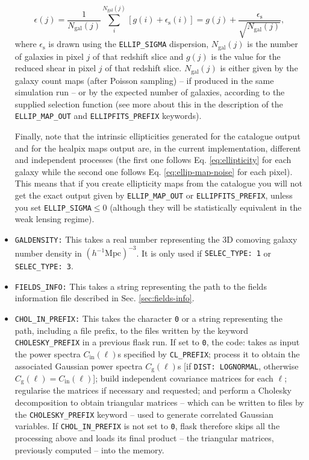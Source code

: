 \documentclass[12pt]{book} %
\newcommand{\nv}[1]{\mathrm{#1}}                 %
\begin{document}
\begin{itemize}
  \begin{equation}
    \epsilon(j) = \frac{1}{N_{\nv{gal}}(j)}\sum_i^{N_{\nv{gal}}(j)} \left[ g(i)+\epsilon_{\nv{s}}(i) \right] 
    = g(j) + \frac{\epsilon_{\nv{s}}}{\sqrt{N_{\nv{gal}}(j)}},
    \label{eq:ellip-map-noise}
  \end{equation}
  where $\epsilon_{\nv{s}}$ is drawn using the {\tt ELLIP\_SIGMA} dispersion, $N_{\nv{gal}}(j)$ is 
  the number of galaxies in pixel $j$ of that redshift slice and $g(j)$ is the value for the 
  reduced shear in pixel $j$ of that redshift slice. $N_{\nv{gal}}(j)$ is either given by the galaxy 
  count maps (after Poisson sampling) -- if produced in the same simulation run -- or by the expected 
  number of galaxies, according to the supplied selection function (see more about this in the 
  description of the {\tt ELLIP\_MAP\_OUT} and {\tt ELLIPFITS\_PREFIX} keywords). 
  
  Finally, note that the intrinsic ellipticities generated for the catalogue output and for the 
  {\sc healpix} maps output are, in the current implementation, different and independent processes 
  (the first one follows Eq. \ref{eq:ellipticity} for each galaxy while the second one follows Eq. 
  \ref{eq:ellip-map-noise} for each pixel). 
  This means that if you create ellipticity maps from the catalogue you will not get the exact output 
  given by {\tt ELLIP\_MAP\_OUT} or {\tt ELLIPFITS\_PREFIX}, unless you set {\tt ELLIP\_SIGMA}$\leq 0$ 
  (although they will be statistically equivalent in the weak lensing regime).
  
\item {\tt GALDENSITY:} This takes a real number representing the 3D comoving galaxy number 
  density in $(h^{-1}\nv{Mpc})^{-3}$. It is only used if {\tt SELEC\_TYPE: 1} or {\tt SELEC\_TYPE: 3}. 

\item {\tt FIELDS\_INFO:} This takes a string representing the path to the fields information file 
  described in Sec. \ref{sec:fields-info}.

\item {\tt CHOL\_IN\_PREFIX:} This takes the character {\tt 0} or a string representing the path, including 
  a file prefix, to the files written by the keyword {\tt CHOLESKY\_PREFIX} in a previous {\sc flask} run. If set to 
  {\tt 0}, the code: takes as input the power spectra $C_{\nv{in}}(\ell)$s specified by {\tt CL\_PREFIX}; 
  process it to obtain the associated Gaussian power spectra $C_{\nv{g}}(\ell)$s [if {\tt DIST: LOGNORMAL}, 
  otherwise $C_{\nv{g}}(\ell)=C_{\nv{in}}(\ell)$]; build independent covariance matrices for each $\ell$; 
  regularise the matrices if necessary and requested; and perform a Cholesky decomposition to obtain 
  triangular matrices -- which can be written to files by the {\tt CHOLESKY\_PREFIX} keyword -- used 
  to generate correlated Gaussian variables. If {\tt CHOL\_IN\_PREFIX} is not set to {\tt 0}, {\sc flask} 
  therefore skips all the processing above and loads its final product -- the triangular matrices, previously
  computed -- into the memory.


\end{itemize}
\end{document}
